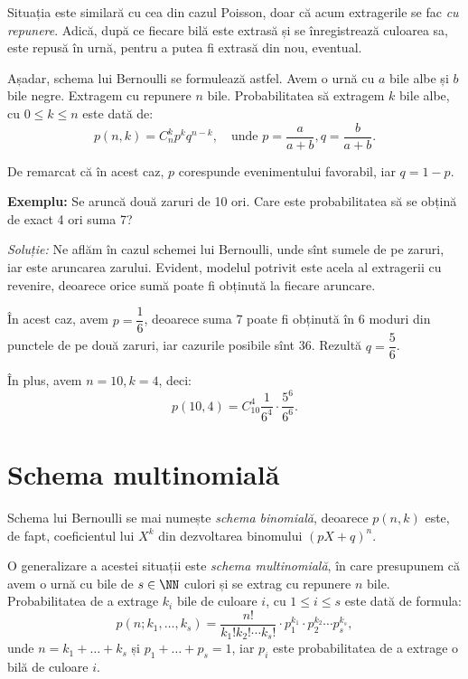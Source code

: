 \indent\indent Situația este similară cu cea din cazul Poisson, doar că acum
extragerile se fac \emph{cu repunere}. Adică, după ce fiecare bilă este extrasă
și se înregistrează culoarea sa, este repusă în urnă, pentru a putea fi extrasă din
nou, eventual.

Așadar, schema lui Bernoulli se formulează astfel. Avem o urnă cu $ a $ bile albe
și $ b $ bile negre. Extragem cu repunere $ n $ bile. Probabilitatea să extragem
$ k $ bile albe, cu $ 0 \leq k \leq n $ este dată de:
\[
  p(n, k) = C_n^k p^k q^{n-k}, \quad \text{unde } p = \frac{a}{a + b}, %
  q = \frac{b}{a + b}.
\]

De remarcat că în acest caz, $ p $ corespunde evenimentului favorabil, iar $ q = 1 - p $.

\vspace{0.3cm}

\textbf{Exemplu:} Se aruncă două zaruri de 10 ori. Care este probabilitatea să se obțină
de exact 4 ori suma 7?

\emph{Soluție:} Ne aflăm în cazul schemei lui Bernoulli, unde  sînt sumele
de pe zaruri, iar  este aruncarea zarului. Evident, modelul potrivit
este acela al extragerii cu revenire, deoarece orice sumă poate fi obținută la fiecare
aruncare.

În acest caz, avem $ p = \dfrac{1}{6} $, deoarece suma 7 poate fi obținută în 6 moduri
din punctele de pe două zaruri, iar cazurile posibile sînt 36. Rezultă $ q = \dfrac{5}{6} $.

În plus, avem $ n = 10, k = 4 $, deci:
\[
  p(10, 4) = C_{10}^4 \frac{1}{6^4} \cdot \frac{5^6}{6^6}.
\]


\section{Schema multinomială}

\indent\indent Schema lui Bernoulli se mai numește \emph{schema binomială},
deoarece $ p(n, k) $ este, de fapt, coeficientul lui $ X^k $ din dezvoltarea
binomului $ (pX + q)^n $.

O generalizare a acestei situații este \emph{schema multinomială}, în care
presupunem că avem o urnă cu bile de $ s \in \NN $ culori și se extrag cu
repunere $ n $ bile. Probabilitatea de a extrage $ k_i $ bile de culoare
$ i $, cu $ 1 \leq i \leq s $ este dată de formula:
\[
  p(n; k_1, \dots, k_s) = \frac{n!}{k_1! k_2! \cdots k_s!} \cdot %
  p_1^{k_1} \cdot p_2^{k_2} \cdots p_s^{k_s},
\]
unde $ n = k_1 + \dots + k_s $ și $ p_1 + \dots + p_s = 1 $, iar
$ p_i $ este probabilitatea de a extrage o bilă de culoare $ i $.

